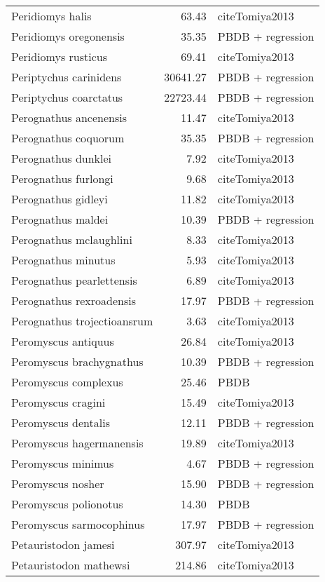 \begin{table}[ht]
\begin{tabular}{lrl}
  Peridiomys halis & 63.43 & cite{Tomiya2013} \\ 
  Peridiomys oregonensis & 35.35 & PBDB + regression \\ 
  Peridiomys rusticus & 69.41 & cite{Tomiya2013} \\ 
  Periptychus carinidens & 30641.27 & PBDB + regression \\ 
  Periptychus coarctatus & 22723.44 & PBDB + regression \\ 
  Perognathus ancenensis & 11.47 & cite{Tomiya2013} \\ 
  Perognathus coquorum & 35.35 & PBDB + regression \\ 
  Perognathus dunklei & 7.92 & cite{Tomiya2013} \\ 
  Perognathus furlongi & 9.68 & cite{Tomiya2013} \\ 
  Perognathus gidleyi & 11.82 & cite{Tomiya2013} \\ 
  Perognathus maldei & 10.39 & PBDB + regression \\ 
  Perognathus mclaughlini & 8.33 & cite{Tomiya2013} \\ 
  Perognathus minutus & 5.93 & cite{Tomiya2013} \\ 
  Perognathus pearlettensis & 6.89 & cite{Tomiya2013} \\ 
  Perognathus rexroadensis & 17.97 & PBDB + regression \\ 
  Perognathus trojectioansrum & 3.63 & cite{Tomiya2013} \\ 
  Peromyscus antiquus & 26.84 & cite{Tomiya2013} \\ 
  Peromyscus brachygnathus & 10.39 & PBDB + regression \\ 
  Peromyscus complexus & 25.46 & PBDB \\ 
  Peromyscus cragini & 15.49 & cite{Tomiya2013} \\ 
  Peromyscus dentalis & 12.11 & PBDB + regression \\ 
  Peromyscus hagermanensis & 19.89 & cite{Tomiya2013} \\ 
  Peromyscus minimus & 4.67 & PBDB + regression \\ 
  Peromyscus nosher & 15.90 & PBDB + regression \\ 
  Peromyscus polionotus & 14.30 & PBDB \\ 
  Peromyscus sarmocophinus & 17.97 & PBDB + regression \\ 
  Petauristodon jamesi & 307.97 & cite{Tomiya2013} \\ 
  Petauristodon mathewsi & 214.86 & cite{Tomiya2013} \\ 

\end{tabular}
\end{table}
